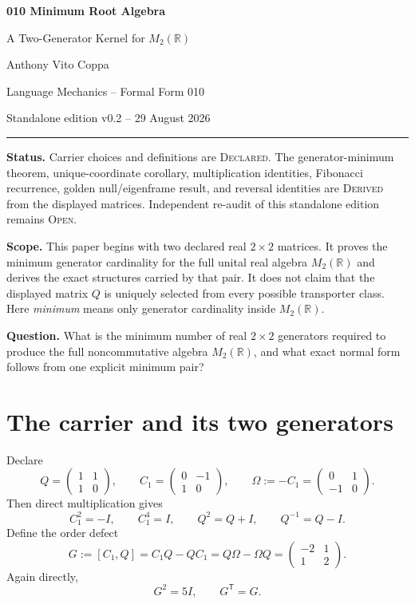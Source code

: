 \documentclass[11pt]{article}
\theoremstyle{definition}
\newcommand{\R}{\mathbb R}
\newcommand{\Mtwo}{M_2(\R)}
\begin{document}
\thispagestyle{first}

\begin{center}
{\Large\bfseries 010 Minimum Root Algebra}\par
\vspace{0.08in}
{\large A Two-Generator Kernel for $M_2(\R)$}\par
\vspace{0.16in}
{Anthony Vito Coppa}\par
\vspace{0.05in}
{\small Language Mechanics -- Formal Form 010}\par
{\small Standalone edition v0.2 -- 29 August 2026}\par
\end{center}
\vspace{0.08in}
\hrule
\vspace{0.12in}

\textbf{Status.} Carrier choices and definitions are \textsc{Declared}. The generator-minimum theorem, unique-coordinate corollary, multiplication identities, Fibonacci recurrence, golden null/eigenframe result, and reversal identities are \textsc{Derived} from the displayed matrices. Independent re-audit of this standalone edition remains \textsc{Open}.

\textbf{Scope.} This paper begins with two declared real $2\times2$ matrices. It proves the minimum generator cardinality for the full unital real algebra $\Mtwo$ and derives the exact structures carried by that pair. It does not claim that the displayed matrix $Q$ is uniquely selected from every possible transporter class. Here \emph{minimum} means only generator cardinality inside $\Mtwo$.

\textbf{Question.} What is the minimum number of real $2\times2$ generators required to produce the full noncommutative algebra $\Mtwo$, and what exact normal form follows from one explicit minimum pair?

\section{The carrier and its two generators}

Declare
\[
Q=\begin{pmatrix}1&1\\[2pt]1&0\end{pmatrix},
\qquad
C_1=\begin{pmatrix}0&-1\\[2pt]1&0\end{pmatrix},
\qquad
\Omega:=-C_1=\begin{pmatrix}0&1\\[2pt]-1&0\end{pmatrix}.
\]
Then direct multiplication gives
\[
C_1^2=-I,\qquad C_1^4=I,\qquad Q^2=Q+I,\qquad Q^{-1}=Q-I.
\]
Define the order defect
\[
G:=[C_1,Q]=C_1Q-QC_1=Q\Omega-\Omega Q
 =\begin{pmatrix}-2&1\\[2pt]1&2\end{pmatrix}.
\]
Again directly,
\[
G^2=5I,\qquad G^{\mathsf T}=G.
\]
\end{document}
